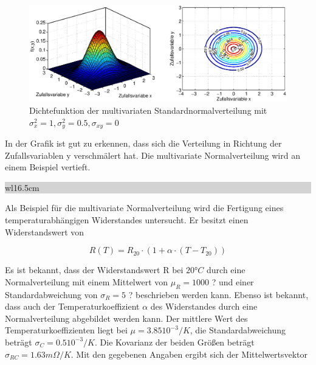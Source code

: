 \noindent 
\begin{figure}[H]
  \centerline{\includegraphics[width=1\textwidth]{Kapitel8/Bilder/image16}}
  \caption{ Dichtefunktion der multivariaten Standardnormalverteilung mit $\sigma_{x}^{2} = 1, \sigma_{y}^{2} = 0.5, \sigma_{xy} = 0$}
  \label{fig:MultivarianteVerteilungen7}
\end{figure}

\noindent In der Grafik ist gut zu erkennen, dass sich die Verteilung in Richtung der Zufallsvariablen y verschm\"{a}lert hat. Die multivariate Normalverteilung wird an einem Beispiel vertieft.\bigskip

\noindent
\colorbox{lightgray}{%
%
\renewcommand\arraystretch{0.6}%
\begin{tabular}{ wl{16.5cm} }
{\selectfont
{}}
\end{tabular}%
}\medskip

\noindent Als Beispiel f\"{u}r die multivariate Normalverteilung wird die Fertigung eines temperaturabh\"{a}ngigen Widerstandes untersucht. Er besitzt einen Widerstandswert von 

\begin{equation}\label{eq:eighteightysix}
R(T)=R_{20} \cdot \left(1+\alpha \cdot (T-T_{20} )\right)
\end{equation}

\noindent Es ist bekannt, dass der Widerstandswert R bei  $20 \si{\degree}C$ durch eine Normalverteilung mit einem Mittelwert von $\mu_{R} = 1000$ ? und einer Standardabweichung von $\sigma_{R}= 5$ ? beschrieben werden kann. Ebenso ist bekannt, dass auch der Temperaturkoeffizient $\alpha$ des Widerstandes durch eine Normalverteilung abgebildet werden kann. Der mittlere Wert des Temperaturkoeffizienten liegt bei $\mu = 3.85 10^{-3}/K$, die Standardabweichung betr\"{a}gt $\sigma_{C}=0.5 10^{-3}/K$. Die Kovarianz der beiden Gr\"{o}{\ss}en betr\"{a}gt $\sigma_{RC} = 1.63 m\Omega/K$. Mit den gegebenen Angaben ergibt sich der Mittelwertsvektor


